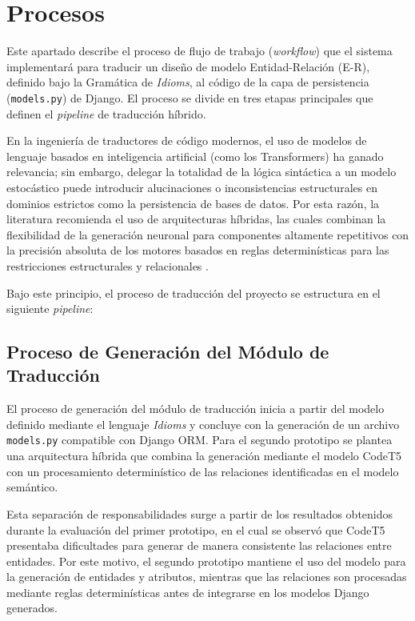 \section{Procesos}
\label{sec:procesos}

Este apartado describe el proceso de flujo de trabajo (\textit{workflow}) que el sistema implementará para traducir un diseño de modelo Entidad-Relación (E-R), definido bajo la Gramática de \textit{Idioms}, al código de la capa de persistencia (\texttt{models.py}) de Django. El proceso se divide en tres etapas principales que definen el \textit{pipeline} de traducción híbrido.

En la ingeniería de traductores de código modernos, el uso de modelos de lenguaje basados en inteligencia artificial (como los Transformers) ha ganado relevancia; sin embargo, delegar la totalidad de la lógica sintáctica a un modelo estocástico puede introducir alucinaciones o inconsistencias estructurales en dominios estrictos como la persistencia de bases de datos. Por esta razón, la literatura recomienda el uso de arquitecturas híbridas, las cuales combinan la flexibilidad de la generación neuronal para componentes altamente repetitivos con la precisión absoluta de los motores basados en reglas determinísticas para las restricciones estructurales y relacionales \cite{pressman2020ingenieria}.

Bajo este principio, el proceso de traducción del proyecto se estructura en el siguiente \textit{pipeline}:

\subsection{Proceso de Generación del Módulo de Traducción}
\label{subsec:proceso-generacion-modulo}

El proceso de generación del módulo de traducción inicia a partir del modelo definido mediante el lenguaje \textit{Idioms} y concluye con la generación de un archivo \texttt{models.py} compatible con Django ORM. Para el segundo prototipo se plantea una arquitectura híbrida que combina la generación mediante el modelo CodeT5 con un procesamiento determinístico de las relaciones identificadas en el modelo semántico.

Esta separación de responsabilidades surge a partir de los resultados obtenidos durante la evaluación del primer prototipo, en el cual se observó que CodeT5 presentaba dificultades para generar de manera consistente las relaciones entre entidades. Por este motivo, el segundo prototipo mantiene el uso del modelo para la generación de entidades y atributos, mientras que las relaciones son procesadas mediante reglas determinísticas antes de integrarse en los modelos Django generados.

